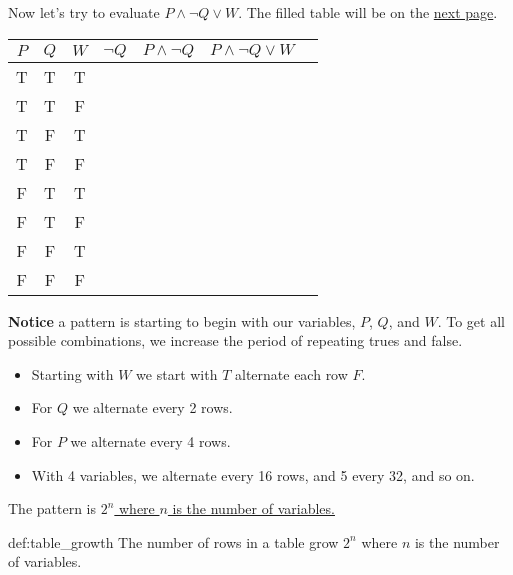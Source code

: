 \vspace{1em}
\noindent
Now let's try to evaluate $P \land \neg Q \lor W$. The filled table will be on the \underline{next page}.

\begin{center}
    \begin{tabular}{|c|c|c|c|c|c|c|}
        \hline
        \rowcolor{OliveGreen!10}
        $P$ & $Q$ & $W$ & $\neg Q$ & $P \land \neg Q$ & $P \land \neg Q \lor W$ \\
        \hline
        T   & T   & T   &          &                  &                         \\
        T   & T   & F   &          &                  &                         \\
        T   & F   & T   &          &                  &                         \\
        T   & F   & F   &          &                  &                         \\
        F   & T   & T   &          &                  &                         \\
        F   & T   & F   &          &                  &                         \\
        F   & F   & T   &          &                  &                         \\
        F   & F   & F   &          &                  &                         \\
        \hline
    \end{tabular}
\end{center}

\noindent
\textbf{Notice} a pattern is starting to begin with our variables, $P$, $Q$, and $W$. To get
all possible combinations, we increase the period of repeating trues and false.
\begin{itemize}
    \item Starting with $W$ we start with $T$ alternate each row $F$.
    \item For $Q$ we alternate every 2 rows.
    \item For $P$ we alternate every 4 rows.
    \item With 4 variables, we alternate every 16 rows, and 5 every 32, and so on.
\end{itemize}
The pattern is \underline{$2^n$ where $n$ is the number of variables.}\\

\begin{Def}{def:table_growth}
    The number of rows in a table grow $2^n$ where $n$ is the number of variables.
\end{Def}

